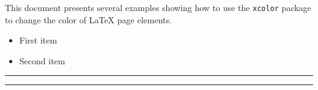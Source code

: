 \documentclass{article}
\begin{document}
	\pagecolor{black}
	\color{white}%
	This document presents several examples showing how to use the \texttt{xcolor} package 
	to change the color of \LaTeX{} page elements.
	
	\begin{itemize}
		\item \textcolor{Mycolor1}{First item}
		\item \textcolor{Mycolor2}{Second item}
	\end{itemize}
	
	\noindent
	{\color{LightRubineRed} \rule{\linewidth}{1mm}}
	
	\noindent
	{\color{RubineRed} \rule{\linewidth}{1mm}}
\end{document}
